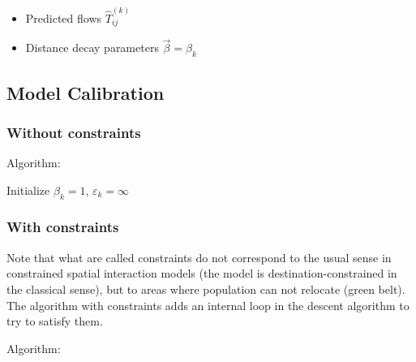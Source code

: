 \documentclass{article}
\begin{document}
\begin{itemize}
    \item Predicted flows $\hat{T}^{(k)}_{ij}$
    \item Distance decay parameters $\vec{\beta} = \beta_k$
\end{itemize}

\subsection*{Model Calibration}


\subsubsection*{Without constraints}

Algorithm:

\begin{algorithm}[H]
 Initialize $\beta_k = 1$, $\varepsilon_k = \infty$\;
\end{algorithm}


\subsubsection*{With constraints}

Note that what are called constraints do not correspond to the usual sense in constrained spatial interaction models (the model is destination-constrained in the classical sense), but to areas where population can not relocate (green belt). The algorithm with constraints adds an internal loop in the descent algorithm to try to satisfy them.



Algorithm:
\end{document}
